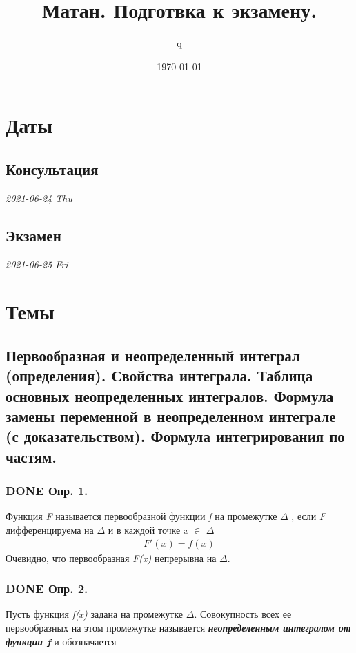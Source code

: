 \documentclass[11pt]{article}
\author{q}
\date{\today}
\title{Матан. Подготвка к экзамену.}
\begin{document}
\maketitle
\tableofcontents

\section{Даты}
\label{sec:org85ad8a2}
\subsection{Консультация}
\label{sec:orgdcf6694}
\emph{2021-06-24 Thu}
\subsection{Экзамен}
\label{sec:orgfcede92}
\emph{2021-06-25 Fri}

\section{Темы}
\label{sec:org90ab14e}
\subsection{Первообразная и неопределенный интеграл (определения). Свойства интеграла. Таблица основных неопределенных интегралов. Формула замены переменной в неопределенном интеграле (с доказательством). Формула интегрирования по частям.}
\label{sec:org13f4bcb}
\subsubsection{{\bfseries\sffamily DONE} Опр. 1.}
\label{sec:org736a72e}
Функция \emph{F} называется первообразной функции \emph{f} на промежутке \(\Delta\) , если \emph{F} дифференцируема на \(\Delta\) и в каждой точке \emph{x} \(\in\) \(\Delta\)
\begin{eqnarray}
F'(x)=f(x)
\end{eqnarray}
Очевидно, что первообразная \emph{F(x)} непрерывна на \(\Delta\).

\subsubsection{{\bfseries\sffamily DONE} Опр. 2.}
\label{sec:org6af49fe}
Пусть функция \emph{f(x)} задана на промежутке \(\Delta\). Совокупность всех ее первообразных на этом промежутке называется \emph{\textbf{неопределенным интегралом от функции \emph{f}}} и обозначается
\end{document}
